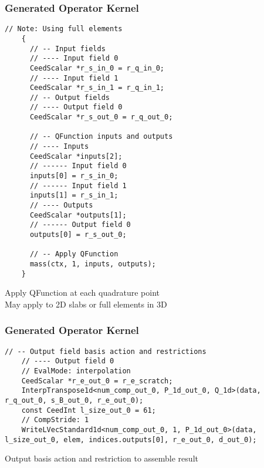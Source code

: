 \documentclass{beamer}
\begin{document}

\begin{frame}[fragile]
\begin{center}
\frametitle{Generated Operator Kernel}

{\tiny
\begin{lstlisting}[style=boxedC]
    // Note: Using full elements
    {
      // -- Input fields
      // ---- Input field 0
      CeedScalar *r_s_in_0 = r_q_in_0;
      // ---- Input field 1
      CeedScalar *r_s_in_1 = r_q_in_1;
      // -- Output fields
      // ---- Output field 0
      CeedScalar *r_s_out_0 = r_q_out_0;

      // -- QFunction inputs and outputs
      // ---- Inputs
      CeedScalar *inputs[2];
      // ------ Input field 0
      inputs[0] = r_s_in_0;
      // ------ Input field 1
      inputs[1] = r_s_in_1;
      // ---- Outputs
      CeedScalar *outputs[1];
      // ------ Output field 0
      outputs[0] = r_s_out_0;

      // -- Apply QFunction
      mass(ctx, 1, inputs, outputs);
    }

\end{lstlisting}
}

Apply QFunction at each quadrature point\\

May apply to 2D slabs or full elements in 3D\\

\end{center}
\end{frame}


\begin{frame}[fragile]
\begin{center}
\frametitle{Generated Operator Kernel}

{\tiny
\begin{lstlisting}[style=boxedC]
    // -- Output field basis action and restrictions
    // ---- Output field 0
    // EvalMode: interpolation
    CeedScalar *r_e_out_0 = r_e_scratch;
    InterpTranspose1d<num_comp_out_0, P_1d_out_0, Q_1d>(data, r_q_out_0, s_B_out_0, r_e_out_0);
    const CeedInt l_size_out_0 = 61;
    // CompStride: 1
    WriteLVecStandard1d<num_comp_out_0, 1, P_1d_out_0>(data, l_size_out_0, elem, indices.outputs[0], r_e_out_0, d_out_0);
\end{lstlisting}
}

Output basis action and restriction to assemble result\\

\end{center}
\end{frame}
\end{document}
